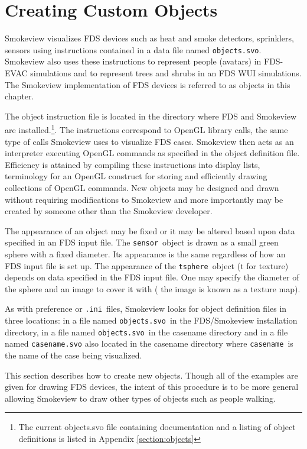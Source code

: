 \documentclass[11pt,twoside]{book}
\begin{document}
\chapter{Creating Custom Objects}
\label{chap:devices}
Smokeview visualizes FDS devices such as heat and smoke detectors,
sprinklers, sensors using instructions contained in a
data file named {\tt objects.svo}.
Smokeview also uses these instructions to represent people (avatars)
in FDS-EVAC simulations and to represent trees and shrubs in an FDS WUI
simulations.
The Smokeview implementation
of FDS devices is referred to as objects in this chapter.

The object instruction file is located in the directory where FDS and
Smokeview are installed.\footnote{The current objects.svo file
containing documentation and a listing of object definitions is listed in
Appendix \ref{section:objects}}.
The instructions correspond to OpenGL library calls,
the same type of calls Smokeview uses to visualize FDS cases.
Smokeview then acts as an interpreter executing OpenGL
commands as specified in the object definition file. Efficiency is
attained by compiling these instructions into display lists,
terminology for an OpenGL construct for storing and efficiently
drawing collections of OpenGL commands.  New objects may be designed
and drawn without requiring modifications to Smokeview and more
importantly may be created by someone other than the Smokeview developer.

The appearance of an object may be fixed or it may be altered based upon
data specified in an FDS input file.  The {\tt sensor}\ object
is drawn as a small green sphere with a fixed diameter.  Its appearance
is the same regardless of how an FDS input file is set up.
The appearance of the {\tt tsphere}\ object (t for texture) depends on
data specified in the FDS input file.  One may specify the diameter of the
sphere and an
image to cover it with ( the image is known as a texture map).

As with preference or {\tt .ini}\ files, Smokeview looks for object definition files in three locations:
in a file named {\tt objects.svo}\ in the FDS/Smokeview installation directory,
in a file named {\tt objects.svo}\ in the casename directory
and in a file named {\tt casename.svo} also located in the casename directory where {\tt casename}\ is the name of the case being visualized.

This section describes how to create new objects. Though all of
the examples are given for drawing FDS devices, the intent of this procedure
is to be more general allowing Smokeview to draw other types of
objects such as people walking.
\end{document}
